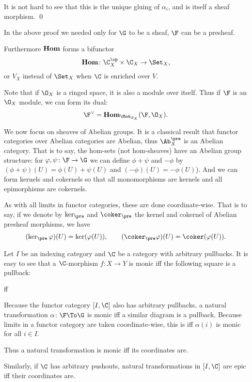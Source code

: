     It is not hard to see that this is the unique gluing of $\alpha_i$, and is itself a sheaf morphism.
    \qed

\eproof

\bnote

    In the above proof we needed only for $\G$ to be a sheaf, $\F$ can be a presheaf.

    Furthermore $\mathop{\bf Hom}\nolimits$ forms a bifunctor
    $$ \ihom\colon\C_X^\op\times\C_X \to \Set_X , $$
    or $V_X$ instead of $\Set_X$ when $\C$ is enriched over $V$.

\enote

Note that if $\O_X$ is a ringed space, it is also a module over itself.
Thus if $\F$ is an $\O_X$ module, we can form its {\emphcolor dual}:
$$ \F^\vee = \ihom_{\Mod_{\O_X}}(\F,\O_X) . $$

We now focus on sheaves of Abelian groups.
It is a classical result that functor categories over Abelian categories are Abelian, thus $\Ab_X^\pre$ is an Abelian category.
That is to say, the hom-sets (not hom-sheaves) have an Abelian group structure: for $\phi,\psi\colon\F\to\G$ we can define $\phi+\psi$
and $-\phi$ by $(\phi+\psi)(U)=\phi(U)+\psi(U)$ and $(-\phi)(U)=-\phi(U)$).
And we can form kernels and cokernels so that all monomorphisms are kernels and all epimorphisms are cokernels.

As with all limits in functor categories, these are done coordinate-wise.
That is to say, if we denote by $\ker_\pre$ and $\coker_\pre$ the kernel and cokernel of Abelian presheaf morphisms, we have
$$ (\ker_\pre\phi)(U) = \ker(\phi(U)),\qquad (\coker_\pre\phi)(U) = \coker(\phi(U)) . $$

\bremark[name={monepiccomp}]

    Let $I$ be an indexing category and $\C$ be a category with arbitrary pullbacks.
    It is easy to see that a $\C$-morphism $f\colon X\to Y$ is monic iff the following square is a pullback:

        {\id}{f}{\id}{f}

    Because the functor category $[I,\C]$ also has arbitrary pullbacks, a natural transformation $\alpha\colon\F\To\G$ is monic iff
    a similar diagram is a pullback.
    Because limits in a functor category are taken coordinate-wise, this is iff $\alpha(i)$ is monic for all $i\in I$.

    Thus a natural transformation is monic iff its coordinates are.

    Similarly, if $\C$ has arbitrary pushouts, natural transformations in $[I,\C]$ are epic iff their coordinates are.

